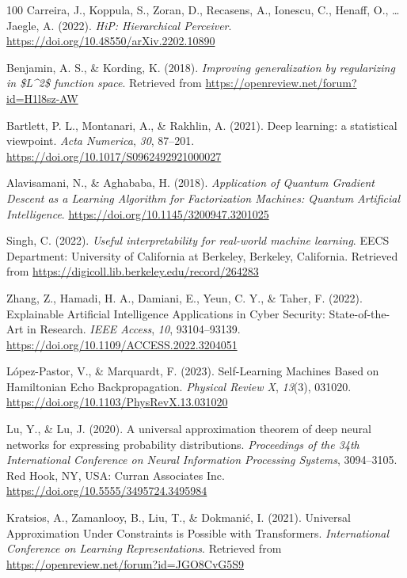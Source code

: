 \documentclass[11pt]{book}
\begin{document}
\begin{thebibliography}{100}
 Carreira, J., Koppula, S., Zoran, D., Recasens, A., Ionescu, C., Henaff,
O., \ldots{} Jaegle, A. (2022). \emph{HiP: Hierarchical Perceiver}.
\url{https://doi.org/10.48550/arXiv.2202.10890}

 Benjamin, A. S., \& Kording, K. (2018). \emph{Improving generalization
by regularizing in \$L\^{}2\$ function space}. Retrieved from
\url{https://openreview.net/forum?id=H1l8sz-AW}

 Bartlett, P. L., Montanari, A., \& Rakhlin, A. (2021). Deep learning: a
statistical viewpoint. \emph{Acta Numerica}, \emph{30}, 87--201.
\url{https://doi.org/10.1017/S0962492921000027}

 Alavisamani, N., \& Aghababa, H. (2018). \emph{Application of Quantum
Gradient Descent as a Learning Algorithm for Factorization Machines:
Quantum Artificial Intelligence}.
\url{https://doi.org/10.1145/3200947.3201025}

 Singh, C. (2022). \emph{Useful interpretability for real-world machine
learning}. EECS Department: University of California at Berkeley,
Berkeley, California. Retrieved from
\url{https://digicoll.lib.berkeley.edu/record/264283}

 Zhang, Z., Hamadi, H. A., Damiani, E., Yeun, C. Y., \& Taher, F. (2022).
Explainable Artificial Intelligence Applications in Cyber Security:
State-of-the-Art in Research. \emph{IEEE Access}, \emph{10},
93104--93139. \url{https://doi.org/10.1109/ACCESS.2022.3204051}

 López-Pastor, V., \& Marquardt, F. (2023). Self-Learning Machines Based
on Hamiltonian Echo Backpropagation. \emph{Physical Review X},
\emph{13}(3), 031020. \url{https://doi.org/10.1103/PhysRevX.13.031020}

 Lu, Y., \& Lu, J. (2020). A universal approximation theorem of deep
neural networks for expressing probability distributions.
\emph{Proceedings of the 34th International Conference on Neural
Information Processing Systems}, 3094--3105. Red Hook, NY, USA: Curran
Associates Inc. \url{https://doi.org/10.5555/3495724.3495984}

 Kratsios, A., Zamanlooy, B., Liu, T., \& Dokmanić, I. (2021). Universal
Approximation Under Constraints is Possible with Transformers.
\emph{International Conference on Learning Representations}. Retrieved
from \url{https://openreview.net/forum?id=JGO8CvG5S9}


\end{thebibliography}
\end{document}
